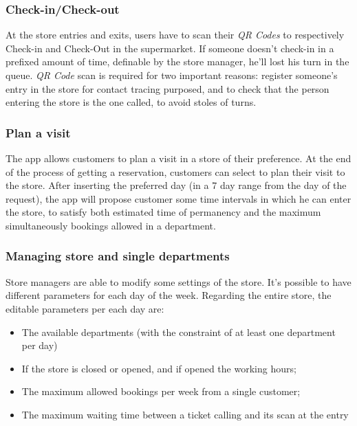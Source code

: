 \documentclass{article}
\begin{document}
		\subsubsection{Check-in/Check-out}
		
		At the store entries and exits, users have to scan their \emph{QR Codes} to respectively Check-in and Check-Out in the supermarket. If someone doesn't check-in in a prefixed amount of time, definable by the store manager, he'll lost his turn in the queue. \emph{QR Code} scan is required for two important reasons: register someone's entry in the store for contact tracing purposed, and to check that the person entering the store is the one called, to avoid stoles of turns.
		
		\subsubsection{Plan a visit}
		
		The app allows customers to plan a visit in a store of their preference. At the end of the process of getting a reservation, customers can select to plan their visit to the store. After inserting the preferred day (in a 7 day range from the day of the request), the app will propose customer some time intervals in which he can enter the store, to satisfy both estimated time of permanency and the maximum simultaneously bookings allowed in a department. 
		
		\subsubsection{Managing store and single departments}
		
		Store managers are able to modify some settings of the store. It's possible to have different parameters for each day of the week. Regarding the entire store, the editable parameters per each day are:
		\begin{itemize}
			\item The available departments (with the constraint of at least one department per day)
			\item If the store is closed or opened, and if opened the working hours;
			\item The maximum allowed bookings per week from a single customer;
			\item The maximum waiting time between a ticket calling and its scan at the entry
		\end{itemize}
	
\end{document}
